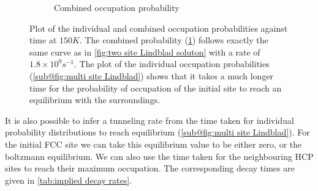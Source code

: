 \begin{figure}[htbp]
\begin{subfigure}{0.45\linewidth}
        \caption{Combined occupation probability
        }\label{sub@fig:multi site combined Lindblad}
    \end{subfigure}
    \caption{Plot of the individual and combined
    occupation probabilities against time at
    \(150K\). The combined
    probability
    (\cref{sub@fig:multi site combined Lindblad})
    follows exactly the same curve as in
    \cref{fig:two site Lindblad soluton}
    with a rate of \(1.8\times{}10^{9}s^{-1}\).
    The plot of the individual occupation
    probabilities
    (\cref{sub@fig:multi site Lindblad})
    shows that it takes
    a much longer time for the
    probability of occupation of the
    initial site to reach
    an equilibrium with the surroundings.}\label{fig:multi site Lindblad}
\end{figure}
It is also possible to infer a
tunneling rate from the
time taken for
individual probability
distributions to reach equilibrium
(\cref{sub@fig:multi site Lindblad}).
For the initial
FCC site we can
take this equilibrium
value to be either zero,
or the boltzmann equilibrium.
We can also
use the time taken for the
neighbouring HCP sites to
reach their maximum occupation.
The corresponding decay times are
given in \cref{tab:implied decay rates}.

